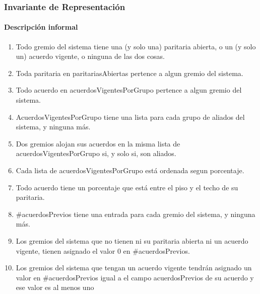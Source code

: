 \subsubsection{Invariante de Representaci\'on}

\paragraph{Descripción informal}
\begin{enumerate}

	\item Todo gremio del sistema tiene una (y solo una) paritaria abierta, o un (y solo un) acuerdo vigente, o ninguna de las dos cosas.
	\item Toda paritaria en paritariasAbiertas pertence a algun gremio del sistema.
	\item Todo acuerdo en acuerdosVigentesPorGrupo pertence a algun gremio del sistema.
	\item AcuerdosVigentesPorGrupo tiene una lista para cada grupo de aliados del sistema, y ninguna más.
	\item Dos gremios alojan sus acuerdos en la misma lista de acuerdosVigentesPorGrupo si, y solo si, son aliados.
	\item Cada lista de acuerdosVigentesPorGrupo está ordenada segun porcentaje.
	\item Todo acuerdo tiene un porcentaje que está entre el piso y el techo de su paritaria.
	\item \#acuerdosPrevios tiene una entrada para cada gremio del sistema, y ninguna más.
	\item Los gremios del sistema que no tienen ni su paritaria abierta ni un acuerdo vigente, tienen asignado el valor 0 en \#acuerdosPrevios.
	\item Los gremios del sistema que tengan un acuerdo vigente tendrán asignado un valor en \#acuerdosPrevios igual a el campo acuerdosPrevios de su acuerdo y  ese valor es al menos uno


\end{enumerate}

